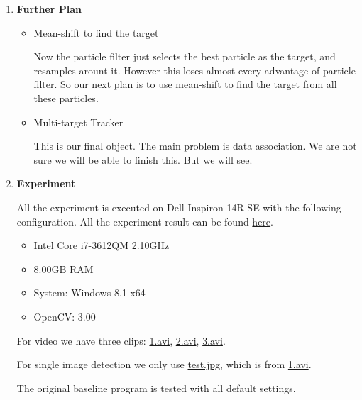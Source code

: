 \documentclass[a4paper]{article}
\begin{document}
\begin{enumerate}
\begin{itemize}
\end{itemize}

\item \textbf{Further Plan}

\begin{itemize}

\item Mean-shift to find the target

Now the particle filter just selects the best particle as the target, and resamples arount it. However this loses almost every advantage of particle filter. So our next plan is to use mean-shift to find the target from all these particles.

\item Multi-target Tracker

This is our final object. The main problem is data association. We are not sure we will be able to finish this. But we will see.

\end{itemize}


\item \textbf{Experiment}

All the experiment is executed on Dell Inspiron 14R SE with the following configuration.
All the experiment result can be found \href{https://zerowong.github.io/PedestrainCounting/results/}{here}.

\begin{itemize}

\item Intel Core i7-3612QM 2.10GHz
\item 8.00GB RAM
\item System: Windows 8.1 x64
\item OpenCV: 3.00

\end{itemize}

For video we have three clips: \href{https://zerowong.github.io/PedestrainCounting/results/test/1.avi}{1.avi}, \href{https://zerowong.github.io/PedestrainCounting/results/test/2.avi}{2.avi}, \href{https://zerowong.github.io/PedestrainCounting/results/test/3.avi}{3.avi}.

For single image detection we only use \href{https://zerowong.github.io/PedestrainCounting/results/test/test.jpg}{test.jpg}, which is from \href{https://zerowong.github.io/PedestrainCounting/results/test/1.avi}{1.avi}.

The original baseline program is tested with all default settings.

\begin{itemize}


\end{itemize}
\end{enumerate}
\end{document}
